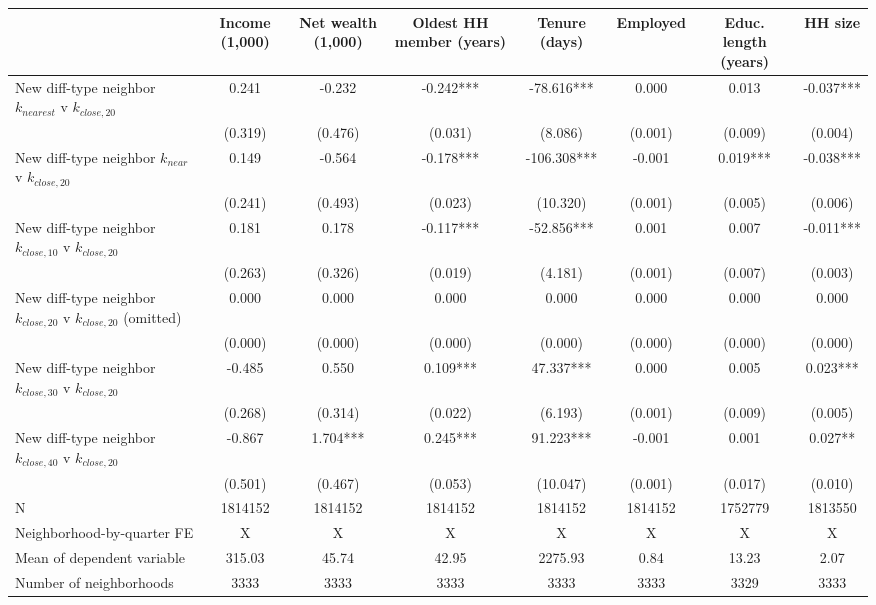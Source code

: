 \begin{tabular}[t]{lccccccc}
\toprule
  & Income (1,000) & Net wealth (1,000) & Oldest HH member (years) & Tenure (days) & Employed & Educ. length (years) & HH size\\
\midrule
New diff-type neighbor $k_{nearest}$ v $k_{close,20}$ & 0.241 & -0.232 & -0.242*** & -78.616*** & 0.000 & 0.013 & -0.037***\\
 & (0.319) & (0.476) & (0.031) & (8.086) & (0.001) & (0.009) & (0.004)\\
New diff-type neighbor $k_{near}$ v $k_{close,20}$ & 0.149 & -0.564 & -0.178*** & -106.308*** & -0.001 & 0.019*** & -0.038***\\
 & (0.241) & (0.493) & (0.023) & (10.320) & (0.001) & (0.005) & (0.006)\\
New diff-type neighbor $k_{close,10}$ v $k_{close,20}$ & 0.181 & 0.178 & -0.117*** & -52.856*** & 0.001 & 0.007 & -0.011***\\
 & (0.263) & (0.326) & (0.019) & (4.181) & (0.001) & (0.007) & (0.003)\\
New diff-type neighbor $k_{close ,20}$ v $k_{close ,20}$ (omitted) & 0.000 & 0.000 & 0.000 & 0.000 & 0.000 & 0.000 & 0.000\\
 & (0.000) & (0.000) & (0.000) & (0.000) & (0.000) & (0.000) & (0.000)\\
New diff-type neighbor $k_{close,30}$ v $k_{close,20}$ & -0.485 & 0.550 & 0.109*** & 47.337*** & 0.000 & 0.005 & 0.023***\\
 & (0.268) & (0.314) & (0.022) & (6.193) & (0.001) & (0.009) & (0.005)\\
New diff-type neighbor $k_{close,40}$ v $k_{close,20}$ & -0.867 & 1.704*** & 0.245*** & 91.223*** & -0.001 & 0.001 & 0.027**\\
 & (0.501) & (0.467) & (0.053) & (10.047) & (0.001) & (0.017) & (0.010)\\
\midrule
N & 1814152 & 1814152 & 1814152 & 1814152 & 1814152 & 1752779 & 1813550\\
Neighborhood-by-quarter FE & X & X & X & X & X & X & X\\
Mean of dependent variable & 315.03 & 45.74 & 42.95 & 2275.93 & 0.84 & 13.23 & 2.07\\
Number of neighborhoods & 3333 & 3333 & 3333 & 3333 & 3333 & 3329 & 3333\\
\bottomrule
\end{tabular}